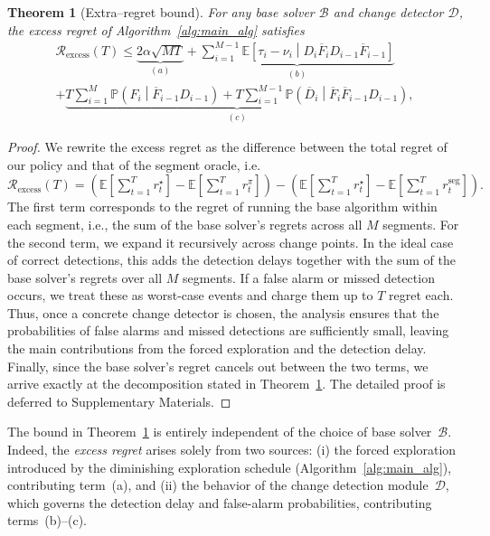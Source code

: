 \documentclass[twoside]{article}
\newcommand{\E}{\mathbb{E}}
\theoremstyle{plain}
\newtheorem{theorem}{Theorem}[section]
\theoremstyle{definition}
\theoremstyle{remark}
\def\Rex{\mathcal{R}_{\mathrm{excess}}}
\begin{document}
\begin{theorem}[Extra–regret bound]\label{thm:general_extra}
For any base solver $\mathcal{B}$ and change detector $\mathcal{D}$, the excess regret of Algorithm~\ref{alg:main_alg} satisfies
\begin{multline} 
\Rex(T)\leq \underbrace{2\alpha\sqrt{MT}}_{(a)}
    +\underbrace{\sum^{M-1}_{i=1}\E\left[\tau_{i}-\nu_{i}\middle | D_{i}\overline{F}_{i}D_{i-1}\overline{F}_{i-1}\right]}_{(b)}\\
+\underbrace{T\sum^{M}_{i=1}\mathbb{P}\left(F_{i}\middle| \overline{F}_{i-1}D_{i-1}\right)+T\sum^{M-1}_{i=1}\mathbb{P}\left(\overline{D}_{i}\middle|\overline{F}_{i}\overline{F}_{i-1}D_{i-1}\right)}_{(c)}, \label{eqn:regret_bound}
\end{multline}
\end{theorem}
\vspace{-5pt}
\begin{proof}
We rewrite the excess regret as the difference between the total regret of our policy and that of the segment oracle, i.e. $\Rex(T)=(\E[\textstyle\sum_{t=1}^T r_t^{\star}]-\E[\textstyle\sum_{t=1}^T r_t^{\pi}])-(\E[\textstyle\sum_{t=1}^T r_t^{\star}]-\E[\textstyle\sum_{t=1}^T r_t^{\mathrm{seg}}]).$
The first term corresponds to the regret of running the base algorithm within each segment, i.e., the sum of the base solver’s regrets across all $M$ segments.
For the second term, we expand it recursively across change points. In the ideal case of correct detections, this adds the detection delays together with the sum of the base solver’s regrets over all $M$ segments.  
If a false alarm or missed detection occurs, we treat these as worst-case events and charge them up to $T$ regret each.  
Thus, once a concrete change detector is chosen, the analysis ensures that the probabilities of false alarms and missed detections are sufficiently small, leaving the main contributions from the forced exploration and the detection delay.  
Finally, since the base solver’s regret cancels out between the two terms, we arrive exactly at the decomposition stated in Theorem~\ref{thm:general_extra}. The detailed proof is deferred to Supplementary Materials.
\end{proof}
\vspace{-5pt}
The bound in Theorem~\ref{thm:general_extra} is entirely independent of the 
choice of base solver~$\mathcal{B}$. 
Indeed, the \emph{excess regret} arises solely from two sources: 
(i) the forced exploration introduced by the diminishing exploration schedule 
(Algorithm~\ref{alg:main_alg}), contributing term~(a), and 
(ii) the behavior of the change detection module~$\mathcal{D}$, which governs 
the detection delay and false-alarm probabilities, contributing terms~(b)--(c). 
\vspace{-5pt}
\end{document}

